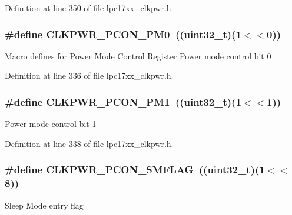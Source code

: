 \-Definition at line 350 of file lpc17xx\-\_\-clkpwr.\-h.

\hypertarget{group___c_l_k_p_w_r___private___macros_gab7f298879442f8edf8e92d77de6da72e}{
\subsubsection[{\-C\-L\-K\-P\-W\-R\-\_\-\-P\-C\-O\-N\-\_\-\-P\-M0}]{\setlength{\rightskip}{0pt plus 5cm}\#define {\bf \-C\-L\-K\-P\-W\-R\-\_\-\-P\-C\-O\-N\-\_\-\-P\-M0}~((uint32\-\_\-t)(1$<$$<$0))}}\label{group___c_l_k_p_w_r___private___macros_gab7f298879442f8edf8e92d77de6da72e}
\-Macro defines for \-Power \-Mode \-Control \-Register \-Power mode control bit 0 

\-Definition at line 336 of file lpc17xx\-\_\-clkpwr.\-h.

\hypertarget{group___c_l_k_p_w_r___private___macros_ga0ab773fbd9de0524bee62239fd9afc78}{
\subsubsection[{\-C\-L\-K\-P\-W\-R\-\_\-\-P\-C\-O\-N\-\_\-\-P\-M1}]{\setlength{\rightskip}{0pt plus 5cm}\#define {\bf \-C\-L\-K\-P\-W\-R\-\_\-\-P\-C\-O\-N\-\_\-\-P\-M1}~((uint32\-\_\-t)(1$<$$<$1))}}\label{group___c_l_k_p_w_r___private___macros_ga0ab773fbd9de0524bee62239fd9afc78}
\-Power mode control bit 1 

\-Definition at line 338 of file lpc17xx\-\_\-clkpwr.\-h.

\hypertarget{group___c_l_k_p_w_r___private___macros_gadbf4e45129e56e124fcccd085597ffb8}{
\subsubsection[{\-C\-L\-K\-P\-W\-R\-\_\-\-P\-C\-O\-N\-\_\-\-S\-M\-F\-L\-A\-G}]{\setlength{\rightskip}{0pt plus 5cm}\#define {\bf \-C\-L\-K\-P\-W\-R\-\_\-\-P\-C\-O\-N\-\_\-\-S\-M\-F\-L\-A\-G}~((uint32\-\_\-t)(1$<$$<$8))}}\label{group___c_l_k_p_w_r___private___macros_gadbf4e45129e56e124fcccd085597ffb8}
\-Sleep \-Mode entry flag 


